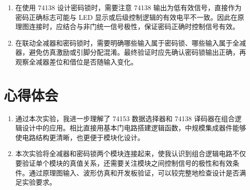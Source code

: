 \documentclass[12pt]{ctexart}
\begin{document}
\begin{enumerate}
    \item 在使用 74138 设计密码锁时，需要注意 74138 输出为低有效信号，直接作为密码正确标志可能与 LED 显示或后级控制逻辑的有效电平不一致。因此在原理图连接时，应结合与非门统一信号极性，保证密码正确时控制信号有效。
    \item 在联动全减器和密码锁时，需要明确哪些输入属于密码锁、哪些输入属于全减器，避免仿真激励或引脚分配混淆。最终验证时应先确认密码锁输出正确，再观察全减器差位和借位是否随输入变化。
\end{enumerate}

\section{心得体会}

\begin{enumerate}
    \item 通过本次实验，我进一步理解了 74153 数据选择器和 74138 译码器在组合逻辑设计中的应用。相比直接用基本门电路搭建逻辑函数，中规模集成器件能够使电路结构更清晰，也更便于模块化设计。
    \item 本次实验将全减器和密码锁两个模块连接起来，使我认识到组合逻辑电路不仅要验证单个模块的真值关系，还需要关注模块之间控制信号的极性和有效条件。通过原理图输入、波形仿真和开发板验证，可以较完整地检查设计是否满足实验要求。
\end{enumerate}
\end{document}
